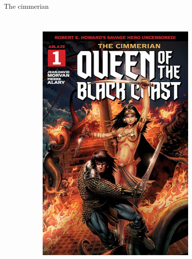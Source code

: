 \begin{frame}{The cimmerian}
	\begin{columns}
		\begin{figure}[htb]
			\centering
			\begin{subfigure}[b]{0.4\textwidth}
				\includegraphics[width=\textwidth]{img/ablazeTC1}
			\end{subfigure}
			~
			\begin{subfigure}[b]{0.4\textwidth}

\end{subfigure}
\end{figure}
\end{columns}
\end{frame}
